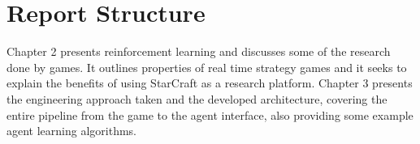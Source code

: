 \section{Report Structure}

Chapter 2 presents reinforcement learning and discusses some of the research
done by games. It outlines properties of real time strategy games and it seeks
to explain the benefits of using StarCraft as a research platform. Chapter 3
presents the engineering approach taken and the developed architecture, covering
the entire pipeline from the game to the agent interface, also providing some
example agent learning algorithms.
